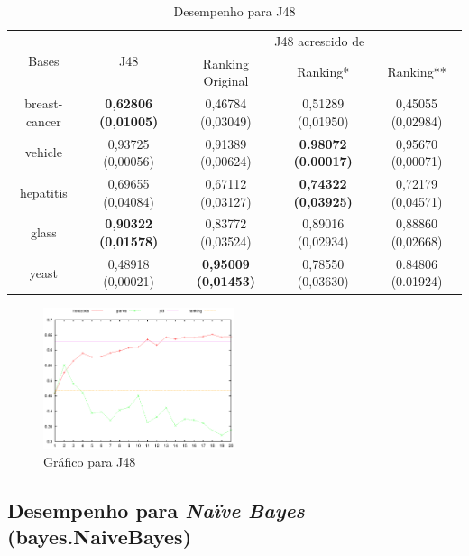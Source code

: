 \begin{table}[h]
    \begin{tabular}{ c c c c c }
        \hline
    
        \multirow{2}{*}{Bases} & \multirow{2}{*}{J48} & \multicolumn{3}{c}{J48 acrescido de} \\ \cline{3-5}
        & & {\small Ranking Original} & {\small Ranking*} & {\small  Ranking**} \\

        \hline
        
        breast-cancer & {\small \textbf{0,62806 (0,01005)}} & {\small 0,46784 (0,03049)} & {\small 0,51289 (0,01950)} & {\small 0,45055 (0,02984)} \\
        vehicle & {\small 0,93725 (0,00056)} & {\small 0,91389 (0,00624)} & {\small \textbf{0.98072 (0.00017)}} & {\small 0,95670 (0,00071)} \\
        hepatitis & {\small 0,69655 (0,04084)} & {\small 0,67112 (0,03127)} & {\small \textbf{0,74322 (0,03925)}} & {\small 0,72179 (0,04571)} \\
        glass & {\small \textbf{0,90322 (0,01578)}} & {\small 0,83772 (0,03524)} & {\small 0,89016 (0,02934)} & {\small 0,88860 (0,02668)} \\
        yeast & {\small 0,48918 (0,00021)} & {\small \textbf{0,95009 (0,01453)}} & {\small 0,78550 (0,03630)} & {\small 0.84806 (0.01924)} \\
    
        \hline
    \end{tabular}
    
    \caption{Desempenho para J48}
    \label{j48_results_table}
\end{table}

\begin{figure}[h]
    \caption{Gráfico para J48}
    \includegraphics[width=0.5\textwidth]{img/breast-cancer_j48.eps}
\end{figure}

\subsection{Desempenho para \emph{Naïve Bayes} (bayes.NaiveBayes)}

